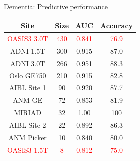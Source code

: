 \documentclass[c]{beamer}
\begin{document}
	\begin{frame}{Dementia: Predictive performance} %
		\centering
		\vfill
		\begin{tabular}{|c|c|c|c|}
			\hline
			\textbf{Site}&\textbf{Size}&\textbf{AUC}&\textbf{Accuracy}\\
			\hline
			\textcolor{red}{OASIS3 3.0T}&\textcolor{red}{430}&\textcolor{red}{0.841}&\textcolor{red}{76.9}\\
			\hline
			ADNI 1.5T&300&0.915&87.0\\
			\hline
			ADNI 3.0T&266&0.951&88.3\\
			\hline
			Oslo GE750&210&0.915&82.8\\
			\hline
			AIBL Site 1&90&0.920&87.7\\
			\hline
			ANM GE&72&0.853&81.9\\
			\hline
			MIRIAD&32&1.00&100\\
			\hline
			AIBL Site 2&22&0.892&86.3\\
			\hline
			ANM Picker&10&0.840&80.0\\
			\hline
			\textcolor{red}{OASIS3 1.5T}&\textcolor{red}{8}&\textcolor{red}{0.812}&\textcolor{red}{75.0}\\
			\hline
		\end{tabular}
		\vfill
	\end{frame}	
	
\end{document}
